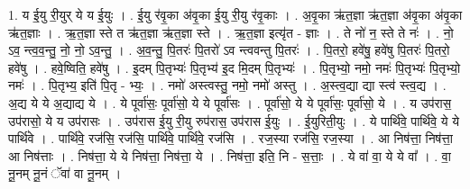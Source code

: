\documentclass[17pt]{extarticle}
\begin{document}
1. य ई॒यु री॒युर् ये य ई॒युः । . ई॒यु र॑वृ॒का अ॑वृ॒का ई॒यु री॒यु र॑वृ॒काः । . अ॒वृ॒का ऋ॑त॒ज्ञा ऋ॑त॒ज्ञा अ॑वृ॒का अ॑वृ॒का ऋ॑त॒ज्ञाः । . ऋ॒त॒ज्ञा स्ते त ऋ॑त॒ज्ञा ऋ॑त॒ज्ञा स्ते । . ऋ॒त॒ज्ञा इत्यृ॑त - ज्ञाः । . ते नो॑ न॒ स्ते ते नः॑ । . नो॒ ऽव॒ न्त्व॒व॒न्तु॒ नो॒ नो॒ ऽव॒न्तु॒ । . अ॒व॒न्तु॒ पि॒तरः॑ पि॒तरो॑ ऽव न्त्ववन्तु पि॒तरः॑ । . पि॒तरो॒ हवे॑षु॒ हवे॑षु पि॒तरः॑ पि॒तरो॒ हवे॑षु । . हवे॒ष्विति॒ हवे॑षु । . इ॒दम् पि॒तृभ्यः॑ पि॒तृभ्य॑ इ॒द मि॒दम् पि॒तृभ्यः॑ । . पि॒तृभ्यो॒ नमो॒ नमः॑ पि॒तृभ्यः॑ पि॒तृभ्यो॒ नमः॑ । . पि॒तृभ्य॒ इति॑ पि॒तृ - भ्यः॒ । . नमो॑ अस्त्वस्तु॒ नमो॒ नमो॑ अस्तु । . अ॒स्त्व॒द्या द्या स्त्व॑ स्त्व॒द्य । . अ॒द्य ये ये अ॒द्याद्य ये । . ये पूर्वा॑सः॒ पूर्वा॑सो॒ ये ये पूर्वा॑सः । . पूर्वा॑सो॒ ये ये पूर्वा॑सः॒ पूर्वा॑सो॒ ये । . य उप॑रास॒ उप॑रासो॒ ये य उप॑रासः । . उप॑रास ई॒यु री॒यु रुप॑रास॒ उप॑रास ई॒युः । . ई॒युरिती॒युः । . ये पार्थि॑वे॒ पार्थि॑वे॒ ये ये पार्थि॑वे । . पार्थि॑वे॒ रज॑सि॒ रज॑सि॒ पार्थि॑वे॒ पार्थि॑वे॒ रज॑सि । . रज॒स्या रज॑सि॒ रज॒स्या । . आ निष॑त्ता॒ निष॑त्ता॒ आ निष॑त्ताः । . निष॑त्ता॒ ये ये निष॑त्ता॒ निष॑त्ता॒ ये । . निष॑त्ता॒ इति॒ नि - स॒त्ताः॒ । . ये वा॑ वा॒ ये ये वा᳚ । . वा॒ नू॒नम् नू॒नं ॅवा॑ वा नू॒नम् । \newline
\end{document}
